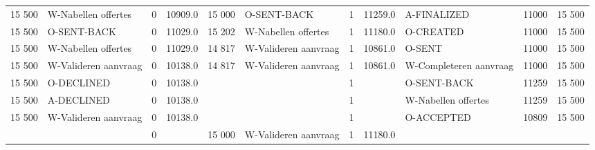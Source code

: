 \begin{tabular}{rlrlrlrllll}
15 500 & W-Nabellen offertes & 0 & 10909.0 & 15 000 & O-SENT-BACK & 1 & 11259.0 & A-FINALIZED & 11000 & 15 500 \\
15 500 & O-SENT-BACK & 0 & 11029.0 & 15 202 & W-Nabellen offertes & 1 & 11180.0 & O-CREATED & 11000 & 15 500 \\
15 500 & W-Nabellen offertes & 0 & 11029.0 & 14 817 & W-Valideren aanvraag & 1 & 10861.0 & O-SENT & 11000 & 15 500 \\
15 500 & W-Valideren aanvraag & 0 & 10138.0 & 14 817 & W-Valideren aanvraag & 1 & 10861.0 & W-Completeren aanvraag & 11000 & 15 500 \\
15 500 & O-DECLINED & 0 & 10138.0 &  &  & 1 &  & O-SENT-BACK & 11259 & 15 500 \\
15 500 & A-DECLINED & 0 & 10138.0 &  &  & 1 &  & W-Nabellen offertes & 11259 & 15 500 \\
15 500 & W-Valideren aanvraag & 0 & 10138.0 &  &  & 1 &  & O-ACCEPTED & 10809 & 15 500 \\
 &  & 0 &  & 15 000 & W-Valideren aanvraag & 1 & 11180.0 &  &  &  \\
\bottomrule
\end{tabular}
